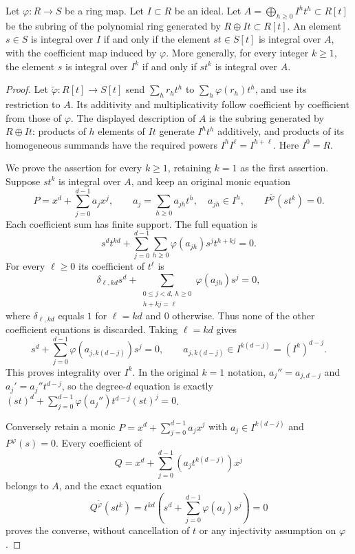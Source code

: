 \begin{lemma}
\label{editorial-source-lemma-characterize-integral-ideal}
Let $\varphi : R \to S$ be a ring map.
Let $I \subset R$ be an ideal.
Let $A = \bigoplus_{h\geq0} I^ht^h \subset R[t]$ be the
subring of the polynomial ring
generated by $R \oplus It \subset R[t]$.
An element $s \in S$ is integral over $I$ if
and only if the element $st \in S[t]$
is integral over $A$, with the coefficient map induced by $\varphi$.
More generally, for every integer $k\geq1$, the element $s$ is
integral over $I^k$ if and only if $st^k$ is integral over $A$.
\end{lemma}

\begin{proof}
Let $\widetilde\varphi:R[t]\to S[t]$ send
$\sum_h r_ht^h$ to $\sum_h\varphi(r_h)t^h$, and use its
restriction to $A$. Its additivity and multiplicativity follow
coefficient by coefficient from those of $\varphi$. The displayed
description of $A$ is the subring generated by $R\oplus It$:
products of $h$ elements of $It$ generate $I^ht^h$ additively,
and products of its homogeneous summands have the required powers
$I^hI^\ell=I^{h+\ell}$. Here $I^0=R$.

We prove the assertion for every $k\geq1$, retaining $k=1$ as
the first assertion. Suppose $st^k$ is integral over $A$, and
keep an original monic equation
$$
P=x^d+\sum_{j=0}^{d-1}a_jx^j,\qquad
a_j=\sum_{h\geq0}a_{jh}t^h,\quad a_{jh}\in I^h,
\qquad P^{\widetilde\varphi}(st^k)=0.
$$
Each coefficient sum has finite support. The full equation is
$$
s^dt^{kd}+\sum_{j=0}^{d-1}\sum_{h\geq0}
  \varphi(a_{jh})s^jt^{h+kj}=0.
$$
For every $\ell\geq0$ its coefficient of $t^\ell$ is
$$
\delta_{\ell,kd}s^d+
\sum_{\substack{0\leq j<d,\ h\geq0\\h+kj=\ell}}
  \varphi(a_{jh})s^j=0,
$$
where $\delta_{\ell,kd}$ equals $1$ for $\ell=kd$ and $0$
otherwise. Thus none of the other coefficient equations is discarded.
Taking $\ell=kd$ gives
$$
s^d+\sum_{j=0}^{d-1}\varphi(a_{j,k(d-j)})s^j=0,
\qquad a_{j,k(d-j)}\in I^{k(d-j)}=(I^k)^{d-j}.
$$
This proves integrality over $I^k$. In the original $k=1$
notation, $a_j''=a_{j,d-j}$ and $a_j'=a_j''t^{d-j}$,
so the degree-$d$ equation is exactly
$(st)^d+\sum_{j=0}^{d-1}\varphi(a_j'')t^{d-j}(st)^j=0$.

Conversely retain a monic $P=x^d+\sum_{j=0}^{d-1}a_jx^j$
with $a_j\in I^{k(d-j)}$ and $P^\varphi(s)=0$.
Every coefficient of
$$
Q=x^d+\sum_{j=0}^{d-1}(a_jt^{k(d-j)})x^j
$$
belongs to $A$, and the exact equation
$$
Q^{\widetilde\varphi}(st^k)
=t^{kd}\left(s^d+\sum_{j=0}^{d-1}\varphi(a_j)s^j\right)=0
$$
proves the converse, without cancellation of $t$ or any
injectivity assumption on $\varphi$.
\end{proof}